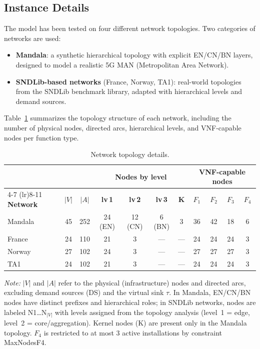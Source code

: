 \documentclass{article}
\begin{document}
\newpage
\subsection*{Instance Details}

The model has been tested on four different network topologies. Two categories of networks are used:
\begin{itemize}
    \item \textbf{Mandala}: a synthetic hierarchical topology with explicit EN/CN/BN layers, designed to model a realistic 5G MAN (Metropolitan Area Network).
    \item \textbf{SNDLib-based networks} (France, Norway, TA1): real-world topologies from the SNDLib benchmark library, adapted with hierarchical levels and demand sources.
\end{itemize}

\vspace{0.5em}
\noindent Table~\ref{tab:topology} summarizes the topology structure of each network, including the number of physical nodes, directed arcs, hierarchical levels, and VNF-capable nodes per function type.

\begin{table}[h!]
\centering
\small
\caption{Network topology details.}
\label{tab:topology}
\begin{tabular}{@{}l c c c c c c c c c c@{}}
\toprule
& & & \multicolumn{4}{c}{\textbf{Nodes by level}} & \multicolumn{4}{c}{\textbf{VNF-capable nodes}} \\
\cmidrule(lr){4-7} \cmidrule(lr){8-11}
\textbf{Network} & $|V|$ & $|A|$ & \textbf{lv\,1} & \textbf{lv\,2} & \textbf{lv\,3} & \textbf{K} & $F_1$ & $F_2$ & $F_3$ & $F_4$ \\
\midrule
Mandala     & 45 & 252 & 24 (EN) & 12 (CN) & 6 (BN) & 3 & 36 & 42 & 18 & 6 \\
\midrule
France      & 24 & 110 & 21 & 3 & --- & --- & 24 & 24 & 24 & 3 \\
Norway      & 27 & 102 & 24 & 3 & --- & --- & 27 & 27 & 27 & 3 \\
TA1         & 24 & 102 & 21 & 3 & --- & --- & 24 & 24 & 24 & 3 \\
\bottomrule
\end{tabular}
\vspace{0.3em}

\footnotesize
\textit{Note:} $|V|$ and $|A|$ refer to the physical (infrastructure) nodes and directed arcs, excluding demand sources (DS) and the virtual sink $\tau$. In Mandala, EN/CN/BN nodes have distinct prefixes and hierarchical roles; in SNDLib networks, nodes are labeled N1\ldots N$_{|V|}$ with levels assigned from the topology analysis (level~1 = edge, level~2 = core/aggregation). Kernel nodes (K) are present only in the Mandala topology. $F_4$ is restricted to at most 3 active installations by constraint MaxNodesF4.
\end{table}
\end{document}
